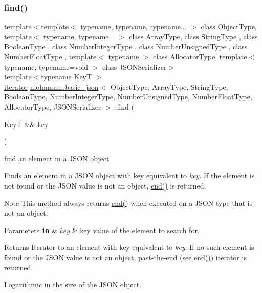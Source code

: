 \subsubsection{\texorpdfstring{find()}{find()}\hspace{0.1cm}{\footnotesize\ttfamily [1/2]}}
{\footnotesize\ttfamily template$<$template$<$ typename, typename, typename... $>$ class Object\+Type, template$<$ typename, typename... $>$ class Array\+Type, class String\+Type , class Boolean\+Type , class Number\+Integer\+Type , class Number\+Unsigned\+Type , class Number\+Float\+Type , template$<$ typename $>$ class Allocator\+Type, template$<$ typename, typename=void $>$ class J\+S\+O\+N\+Serializer$>$ \\
template$<$typename KeyT $>$ \\
\hyperlink{classnlohmann_1_1basic__json_a099316232c76c034030a38faa6e34dca}{iterator} \hyperlink{classnlohmann_1_1basic__json}{nlohmann\+::basic\+\_\+json}$<$ Object\+Type, Array\+Type, String\+Type, Boolean\+Type, Number\+Integer\+Type, Number\+Unsigned\+Type, Number\+Float\+Type, Allocator\+Type, J\+S\+O\+N\+Serializer $>$\+::find (\begin{DoxyParamCaption}\item[{KeyT \&\&}]{key }\end{DoxyParamCaption})\hspace{0.3cm}{\ttfamily [inline]}}



find an element in a J\+S\+ON object 

Finds an element in a J\+S\+ON object with key equivalent to {\itshape key}. If the element is not found or the J\+S\+ON value is not an object, \hyperlink{classnlohmann_1_1basic__json_a13e032a02a7fd8a93fdddc2fcbc4763c}{end()} is returned.

\begin{DoxyNote}{Note}
This method always returns \hyperlink{classnlohmann_1_1basic__json_a13e032a02a7fd8a93fdddc2fcbc4763c}{end()} when executed on a J\+S\+ON type that is not an object.
\end{DoxyNote}

\begin{DoxyParams}[1]{Parameters}
\mbox{\tt in}  & {\em key} & key value of the element to search for.\\
\hline
\end{DoxyParams}
\begin{DoxyReturn}{Returns}
Iterator to an element with key equivalent to {\itshape key}. If no such element is found or the J\+S\+ON value is not an object, past-\/the-\/end (see \hyperlink{classnlohmann_1_1basic__json_a13e032a02a7fd8a93fdddc2fcbc4763c}{end()}) iterator is returned.
\end{DoxyReturn}
Logarithmic in the size of the J\+S\+ON object.

